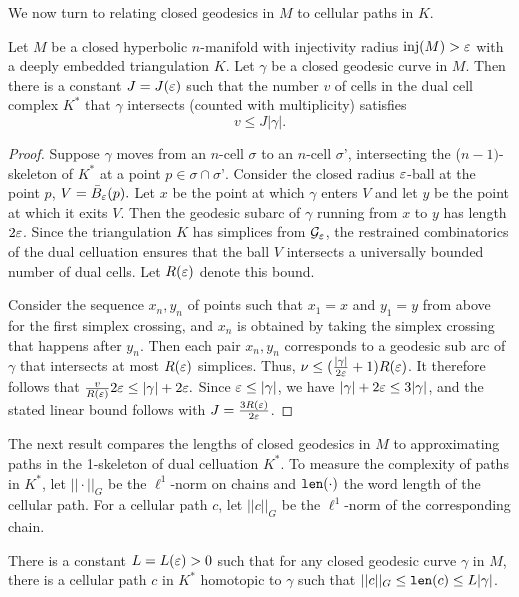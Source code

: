 We now turn to relating closed geodesics in $M$ to cellular paths in $K$.

\begin{prop} \label{prop: loop multiplicity}
Let $M$ be a closed hyperbolic $n$-manifold with injectivity radius $\operatorname{inj}(M)>\varepsilon$ with a deeply embedded triangulation $K$. Let $\gamma$ be a closed geodesic curve in $M$. Then there is a constant $J = J(\varepsilon)$ such that the number $v$ of cells in the dual cell complex $K^*$ that $\gamma$ intersects (counted with multiplicity) satisfies \[v\leq J|\gamma|.\] \end{prop}

\begin{proof}

Suppose $\gamma$ moves from an $n$-cell $\sigma$ to an $n$-cell $\sigma’$, intersecting the ($n-1)$-skeleton of $K^*$ at a point $p\in \sigma\cap \sigma’$. Consider the closed radius $\varepsilon$-ball at the point $p$, $V = \bar B_{\varepsilon}(p).$ Let $x$ be the point at which $\gamma$ enters $V$ and let $y$ be the point at which it exits $V$.
Then the geodesic subarc of $\gamma$ running from $x$ to $y$ has length $2\varepsilon$. Since the triangulation $K$ has simplices from $\mathcal G_{\varepsilon}$, the restrained combinatorics of the dual celluation ensures that the ball $V$ intersects a universally bounded number of dual cells. Let $R(\varepsilon)$ denote this bound.

Consider the sequence $x_n,y_n$ of points such that $x_1 = x$ and $y_1 = y$ from above for the first simplex crossing, and $x_n$ is obtained by taking the simplex crossing that happens after $y_n$. Then each pair $x_n,y_n$ corresponds to a geodesic sub arc of $\gamma$ that intersects at most $R(\varepsilon)$ simplices. Thus, $\nu \leq (\frac{|\gamma|}{2\varepsilon} +1)R(\varepsilon)$.
It therefore follows that $\frac{v}{R(\varepsilon)} 2\varepsilon \leq |\gamma| + 2\varepsilon.$ Since $\varepsilon \leq |\gamma|$, we have $|\gamma|+2\varepsilon\leq 3|\gamma|$, and the stated linear bound follows with $J = \frac{3R(\varepsilon)}{2\varepsilon}$. \end{proof}

The next result compares the lengths of closed geodesics in $M$ to approximating paths in the 1-skeleton of dual celluation $K^*$. To measure the complexity of paths in $K^*$, let $||\cdot||_G$ be the $\ell^1$-norm on chains and $\operatorname{{\tt{len}}}(\cdot)$ the word length of the cellular path. For a cellular path $c$, let $||c||_G$ be the $\ell^1$-norm of the corresponding chain.

\begin{prop} \label{prop: length comparison} There is a constant $L = L(\varepsilon)>0$ such that for any closed geodesic curve $\gamma$ in $M$, there is a cellular path $c$ in $K^*$ homotopic to $\gamma$ such that $||c||_G\leq \operatorname{{\tt{len}}}(c) \leq L|\gamma|$.
\end{prop}

